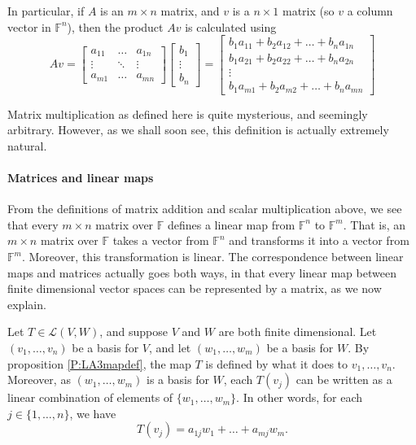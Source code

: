\documentclass{article}
\theoremstyle{plain}
\newcommand{\bF}{\mathbb{F}}
\newcommand{\cL}{\mathcal{L}}
\begin{document}
In particular, if $A$ is an $m\times n$ matrix, and $v$ is a $n\times 1$ matrix (so $v$ a column vector in $\bF^n$), then the product $Av$ is calculated using
\[Av = \begin{bmatrix}
a_{11}  & \dots & a_{1n} \\
\vdots & \ddots & \vdots \\
a_{m1}  & \dots & a_{mn} 
\end{bmatrix}
\begin{bmatrix}
b_1\\
\vdots\\
b_n
\end{bmatrix}
=
\begin{bmatrix}
b_1a_{11} + b_2a_{12}+ \ldots + b_na_{1n} \\
b_1a_{21} + b_2a_{22}+ \ldots + b_na_{2n}\\
\vdots\\
b_1a_{m1} + b_2a_{m2}+ \ldots + b_na_{mn}
\end{bmatrix}\]

Matrix multiplication as defined here is quite mysterious, and seemingly arbitrary. However, as we shall soon see, this definition is actually extremely natural.

\paragraph{Matrices and linear maps}

From the definitions of matrix addition and scalar multiplication above, we see that every $m\times n$ matrix over $\bF$ defines a linear map from $\bF^n$ to $\bF^m$. That is, an $m\times n$ matrix over $\bF$ takes a vector from $\bF^n$ and transforms it into a vector from $\bF^m$. Moreover, this transformation is linear. The correspondence between linear maps and matrices actually goes both ways, in that every linear map between finite dimensional vector spaces can be represented by a matrix, as we now explain. 

Let $T\in \cL(V,W)$, and suppose $V$ and $W$ are both finite dimensional. Let $(v_1,\ldots,v_n)$ be a basis for $V$, and let $(w_1,\ldots,w_m)$ be a basis for $W$. By proposition \ref{P:LA3mapdef}, the map $T$ is defined by what it does to $v_1,\ldots,v_n$. Moreover, as $(w_1,\ldots,w_m)$ is a basis for $W$, each $T(v_j)$ can be written as a linear combination of elements of $\{w_1,\ldots,w_m\}$. In other words, for each $j\in\{1,\ldots,n\}$, we have 
\[\tag{$\dagger$} T(v_j) = a_{1j}w_1 + \ldots + a_{mj} w_m.\]
\end{document}
